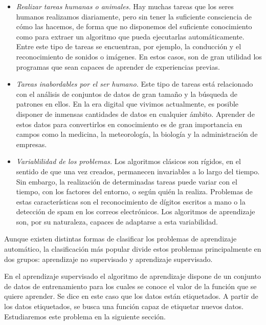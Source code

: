 \begin{itemize}
    \item \textit{Realizar tareas humanas o animales.} Hay muchas tareas que los seres humanos realizamos diariamente, pero sin tener la suficiente consciencia de cómo las hacemos, de forma que no disponemos del suficiente conocimiento como para extraer un algoritmo que pueda ejecutarlas automáticamente. Entre este tipo de tareas se encuentran, por ejemplo, la conducción y el reconocimiento de sonidos o imágenes. En estos casos, son de gran utilidad los programas que sean capaces de aprender de experiencias previas.

    \item \textit{Tareas inabordables por el ser humano.} Este tipo de tareas está relacionado con el análisis de conjuntos de datos de gran tamaño y la búsqueda de patrones en ellos. En la era digital que vivimos actualmente, es posible disponer de inmensas cantidades de datos en cualquier ámbito. Aprender de estos datos para convertirlos en conocimiento es de gran importancia en campos como la medicina, la meteorología, la biología y la administración de empresas.

    \item \textit{Variablilidad de los problemas.} Los algoritmos clásicos son rígidos, en el sentido de que una vez creados, permanecen invariables a lo largo del tiempo. Sin embargo, la realización de determinadas tareas puede variar con el tiempo, con los factores del entorno, o según quién la realiza. Problemas de estas características son el reconocimiento de dígitos escritos a mano o la detección de spam en los correos electrónicos. Los algoritmos de aprendizaje son, por su naturaleza, capaces de adaptarse a esta variabilidad.
\end{itemize}

Aunque existen distintas formas de clasificar los problemas de aprendizaje automático, la clasificación más popular divide estos problemas principalmente en dos grupos: aprendizaje no supervisado y aprendizaje supervisado.

En el aprendizaje supervisado el algoritmo de aprendizaje dispone de un conjunto de datos de entrenamiento para los cuales se conoce el valor de la función que se quiere aprender. Se dice en este caso que los datos están etiquetados. A partir de los datos etiquetados, se busca una función capaz de etiquetar nuevos datos. Estudiaremos este problema en la siguiente sección.

